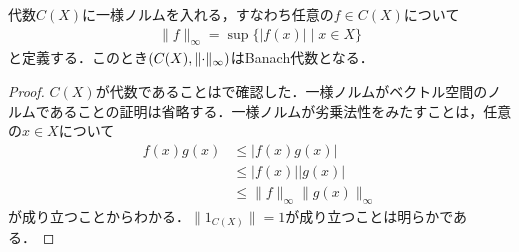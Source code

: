 \documentclass[../main.tex]{subfiles}
\begin{document}
\begin{thmbox}
\begin{proposition}
代数\(C(X)\)に一様ノルムを入れる，すなわち任意の\(f \in C(X)\)について
\begin{align*}
    \lVert f \rVert_\infty = \sup \{ \lvert f(x) \rvert \mid x \in X \}
\end{align*}
と定義する．このとき\((C(X), \lVert \mathord{\cdot} \rVert_\infty)\)はBanach代数となる．
\end{proposition}
\end{thmbox}

\begin{proof} \(C(X)\)が代数であることはで確認した．一様ノルムがベクトル空間のノルムであることの証明は省略する．一様ノルムが劣乗法性をみたすことは，任意の\(x \in X\)について
\begin{align*}
    f(x)g(x)
    &\leq \lvert f(x) g(x) \vert \\
    &\leq \lvert f(x) \rvert \lvert g(x) \vert \\
    &\leq \lVert f \rVert_\infty \lVert g(x) \rVert_\infty
\end{align*}
が成り立つことからわかる．\(\lVert 1_{C(X)} \rVert = 1\)が成り立つことは明らかである．


\end{proof}
\end{document}

